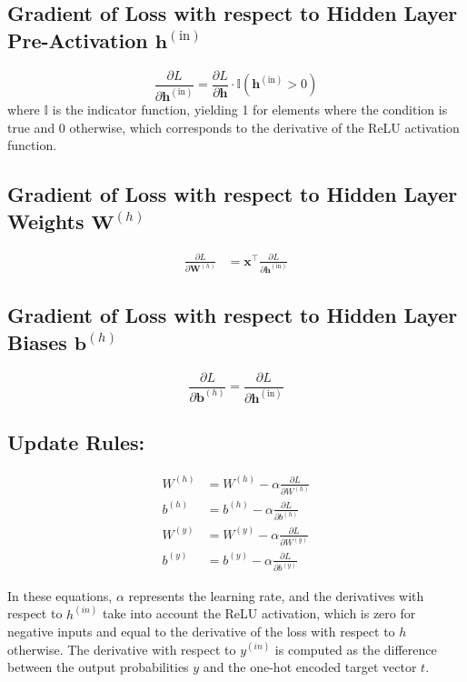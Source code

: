 \documentclass[11pt]{article}
\begin{document}
\subsection*{Gradient of Loss with respect to Hidden Layer Pre-Activation \( \mathbf{h}^{(\text{in})} \)}
\begin{equation*}
\frac{\partial L}{\partial \mathbf{h}^{(\text{in})}} = \frac{\partial L}{\partial \mathbf{h}} \cdot \mathbb{I}(\mathbf{h}^{(\text{in})} > 0)
\end{equation*}
where \( \mathbb{I} \) is the indicator function, yielding 1 for elements where the condition is true and 0 otherwise, which corresponds to the derivative of the ReLU activation function.

\subsection*{Gradient of Loss with respect to Hidden Layer Weights \( \mathbf{W}^{(h)} \)}
\begin{align*}
\frac{\partial L}{\partial \mathbf{W}^{(h)}} &= \mathbf{x}^\top \frac{\partial L}{\partial \mathbf{h}^{(\text{in})}}
\end{align*}

\subsection*{Gradient of Loss with respect to Hidden Layer Biases \( \mathbf{b}^{(h)} \)}
\begin{equation*}
\frac{\partial L}{\partial \mathbf{b}^{(h)}} = \frac{\partial L}{\partial \mathbf{h}^{(\text{in})}}
\end{equation*}

\subsection*{Update Rules:}
\begin{align*}
W^{(h)} &= W^{(h)} - \alpha \frac{\partial L}{\partial W^{(h)}} \\
b^{(h)} &= b^{(h)} - \alpha \frac{\partial L}{\partial b^{(h)}} \\
W^{(y)} &= W^{(y)} - \alpha \frac{\partial L}{\partial W^{(y)}} \\
b^{(y)} &= b^{(y)} - \alpha \frac{\partial L}{\partial b^{(y)}}
\end{align*}

In these equations, \( \alpha \) represents the learning rate, and the derivatives with respect to \( h^{(in)} \) take into account the ReLU activation, which is zero for negative inputs and equal to the derivative of the loss with respect to \( h \) otherwise. The derivative with respect to \( y^{(in)} \) is computed as the difference between the output probabilities \( y \) and the one-hot encoded target vector \( t \).
\end{document}
